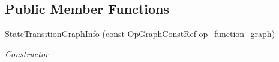 \subsection*{Public Member Functions}
\begin{DoxyCompactItemize}
\item 
\hyperlink{structStateTransitionGraphInfo_adde59e509275b80c1736092fc3c1448a}{State\+Transition\+Graph\+Info} (const \hyperlink{op__graph_8hpp_a9a0b240622c47584bee6951a6f5de746}{Op\+Graph\+Const\+Ref} \hyperlink{structStateTransitionGraphInfo_ae327d741c56cc18d06bba996d9fdc381}{op\+\_\+function\+\_\+graph})
\begin{DoxyCompactList}\small\item\em Constructor. \end{DoxyCompactList}\end{DoxyCompactItemize}
